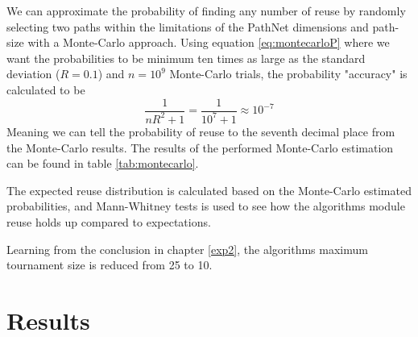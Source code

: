 

We can approximate the probability of finding any number of reuse by randomly selecting two paths within the limitations of the PathNet dimensions and path-size with a Monte-Carlo approach. Using equation \ref{eq:montecarloP} where we want the probabilities to be minimum ten times as large as the standard deviation (\(R=0.1\)) and \(n=10^{9}\) Monte-Carlo trials, the probability "accuracy" is calculated to be
\begin{equation*}
    \frac{1}{nR^{2}+1}=\frac{1}{10^{7}+1}\approx10^{-7}
\end{equation*}
Meaning we can tell the probability of reuse to the seventh decimal place from the Monte-Carlo results. The results of the performed Monte-Carlo estimation can be found in table \ref{tab:montecarlo}.

The expected reuse distribution is calculated based on the Monte-Carlo estimated probabilities, and Mann-Whitney tests is used to see how the algorithms module reuse holds up compared to expectations.

Learning from the conclusion in chapter \ref{exp2}, the algorithms maximum tournament size is reduced from 25 to 10.

\section{Results}


